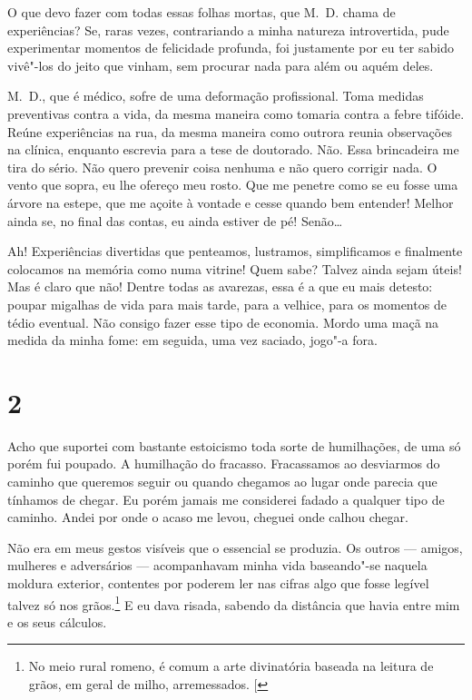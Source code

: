 O que devo fazer com todas essas folhas mortas, que M.~D. chama de
experiências? Se, raras vezes, contrariando a minha natureza
introvertida, pude experimentar momentos de felicidade profunda, foi
justamente por eu ter sabido vivê"-los do jeito que vinham, sem procurar
nada para além ou aquém deles.

M.~D., que é médico, sofre de uma deformação profissional. Toma medidas
preventivas contra a vida, da mesma maneira como tomaria contra a febre
tifóide. Reúne experiências na rua, da mesma maneira como outrora reunia
observações na clínica, enquanto escrevia para a tese de doutorado. Não.
Essa brincadeira me tira do sério. Não quero prevenir coisa nenhuma e
não quero corrigir nada. O vento que sopra, eu lhe ofereço meu rosto.
Que me penetre como se eu fosse uma árvore na estepe, que me açoite à
vontade e cesse quando bem entender! Melhor ainda se, no final das
contas, eu ainda estiver de pé! Senão\ldots{}

Ah! Experiências divertidas que penteamos, lustramos, simplificamos e
finalmente colocamos na memória como numa vitrine! Quem sabe? Talvez
ainda sejam úteis! Mas é claro que não! Dentre
todas as avarezas, essa é a que eu mais detesto: poupar migalhas de vida
para mais tarde, para a velhice, para os momentos de tédio eventual. Não
consigo fazer esse tipo de economia. Mordo uma maçã na medida da minha
fome: em seguida, uma vez saciado, jogo"-a fora.

\section{2}

Acho que suportei com bastante estoicismo toda sorte de humilhações, de
uma só porém fui poupado. A humilhação do fracasso. Fracassamos ao
desviarmos do caminho que queremos seguir ou quando chegamos ao lugar
onde parecia que tínhamos de chegar. Eu porém jamais me considerei
fadado a qualquer tipo de caminho. Andei por onde o acaso me levou,
cheguei onde calhou chegar.

Não era em meus gestos visíveis que o essencial se produzia. Os outros ---
amigos, mulheres e adversários --- acompanhavam minha vida baseando"-se
naquela moldura exterior, contentes por poderem ler nas cifras algo que
fosse legível talvez só nos grãos.\footnote{No meio
rural romeno, é comum a arte divinatória baseada na leitura de grãos, em
geral de milho, arremessados. {[}\versal{N.~T.}{]}} E eu dava risada, sabendo da distância
que havia entre mim e os seus cálculos.

